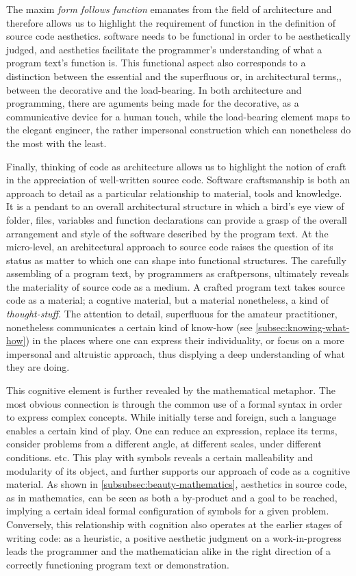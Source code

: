The maxim \emph{form follows function} emanates from the field of architecture and therefore allows us to highlight the requirement of function in the definition of source code aesthetics. software needs to be functional in order to be aesthetically judged, and aesthetics facilitate the programmer's understanding of what a program text's function is. This functional aspect also corresponds to a distinction between the essential and the superfluous or, in architectural terms,, between the decorative and the load-bearing. In both architecture and programming, there are aguments being made for the decorative, as a communicative device for a human touch, while the load-bearing element maps to the elegant engineer, the rather impersonal construction which can nonetheless do the most with the least.

Finally, thinking of code as architecture allows us to highlight the notion of craft in the appreciation of well-written source code. Software craftsmanship is both an approach to detail as a particular relationship to material, tools and knowledge. It is a pendant to an overall architectural structure in which a bird's eye view of folder, files, variables and function declarations can provide a grasp of the overall arrangement and style of the software described by the program text. At the micro-level, an architectural approach to source code raises the question of its status as matter to which one can shape into functional structures. The carefully assembling of a program text, by programmers as craftpersons, ultimately reveals the materiality of source code as a medium. A crafted program text takes source code as a material; a cogntive material, but a material nonetheless, a kind of \emph{thought-stuff}. The attention to detail, superfluous for the amateur practitioner, nonetheless communicates a certain kind of know-how (see \ref{subsec:knowing-what-how}) in the places where one can express their individuality, or focus on a more impersonal and altruistic approach, thus displying a deep understanding of what they are doing.

This cognitive element is further revealed by the mathematical metaphor. The most obvious connection is through the common use of a formal syntax in order to express complex concepts. While initially terse and foreign, such a language enables a certain kind of play. One can reduce an expression, replace its terms, consider problems from a different angle, at different scales, under different conditions. etc. This play with symbols reveals a certain malleability and modularity of its object, and further supports our approach of code as a cognitive material. As shown in \ref{subsubsec:beauty-mathematics}, aesthetics in source code, as in mathematics, can be seen as both a by-product and a goal to be reached, implying a certain ideal formal configuration of symbols for a given problem. Conversely, this relationship with cognition also operates at the earlier stages of writing code: as a heuristic, a positive aesthetic judgment on a work-in-progress leads the programmer and the mathematician alike in the right direction of a correctly functioning program text or demonstration.


